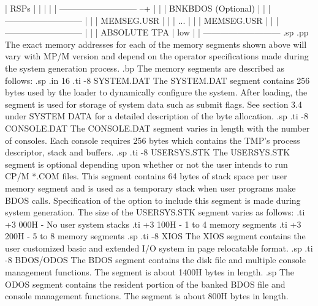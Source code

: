                     |          RSPs           |   |
                    |                         |   |
                    --------------------------- --+
                    |                         |
                    |    BNKBDOS (Optional)   |
                    |                         |
                    ---------------------------
                    |                         |
                    |        MEMSEG.USR       |
                    |                         |
                                ...
                    |                         |
                    |        MEMSEG.USR       |
                    |                         |
                    ---------------------------
                    |                         |
                    |      ABSOLUTE TPA       |
              low   |                         |
                    ---------------------------
.sp
.pp
The exact memory addresses for each of the memory segments shown
above will vary with MP/M version and depend on the
operator specifications made during the system generation process.
.bp
The memory segments are described as follows:
.sp
.in 16
.ti -8
SYSTEM.DAT    The SYSTEM.DAT segment contains 256 bytes used by the
loader to dynamically configure the system.  After loading, the
segment is used for storage of system data such as submit flags.
See section 3.4 under SYSTEM DATA for a detailed description of
the byte allocation.
.sp
.ti -8
CONSOLE.DAT   The CONSOLE.DAT segment varies in length with the
number of consoles.  Each console requires 256 bytes which contains
the TMP's process descriptor, stack and buffers.
.sp
.ti -8
USERSYS.STK   The USERSYS.STK segment is optional depending upon
whether or not the user intends to run CP/M *.COM files.  This
segment contains 64 bytes of stack space per user memory segment
and is used as a temporary stack when user programs make
BDOS calls.  Specification of the option to include this segment
is made during system generation.
The size of the USERSYS.STK segment varies as follows:
.ti +3
000H - No user system stacks
.ti +3
100H - 1 to 4 memory segments
.ti +3
200H - 5 to 8 memory segments
.sp
.ti -8
XIOS          The XIOS segment contains the user customized
basic and extended I/O system in page relocatable format.
.sp
.ti -8
BDOS/ODOS     The BDOS segment contains the disk file and multiple
console management functions.  The segment is about 1400H bytes
in length.
.sp
The ODOS segment contains the resident portion of the banked BDOS
file and console management functions.  The segment is about 800H bytes
in length.

